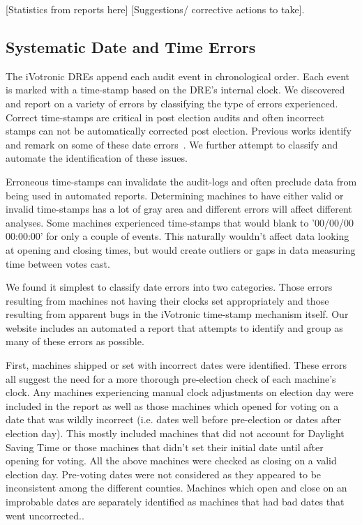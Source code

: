 [Statistics from reports here] [Suggestions/ corrective actions to take].  

\subsection{Systematic Date and Time Errors}
The iVotronic DREs append each audit event in chronological order.  Each event is marked with a time-stamp based on the DRE's internal clock.  We discovered and report on a variety of errors by classifying the type of errors experienced. Correct time-stamps are critical in post election audits and often incorrect stamps can not be automatically corrected post election.  Previous works identify and remark on some of these date errors~\cite{Buell2011,Sandler2007}.  We further attempt to classify and automate the identification of these issues.

Erroneous time-stamps can invalidate the audit-logs and often preclude data from being used in automated reports.  Determining machines to have either valid or invalid time-stamps has a lot of gray area and different errors will affect different analyses.  Some machines experienced time-stamps that would blank to '00/00/00 00:00:00' for only a couple of events.  This naturally wouldn't affect data looking at opening and closing times, but would create outliers or gaps in data measuring time between votes cast.  

We found it simplest to classify date errors into two categories.  Those errors resulting from machines not having their clocks set appropriately and those resulting from apparent bugs in the iVotronic time-stamp mechanism itself.  Our website includes an automated a report that attempts to identify and group as many of these errors as possible.

First, machines shipped or set with incorrect dates were identified.  These errors all suggest the need for a more thorough pre-election check of each machine's clock.   Any machines experiencing manual clock adjustments on election day were included in the report as well as those machines which opened for voting on a date that was wildly incorrect (i.e. dates well before pre-election or dates after election day). This mostly included machines that did not account for Daylight Saving Time or  those machines that didn't set their initial date until after opening for voting.  All the above machines were checked as closing on a valid election day.  Pre-voting dates were not considered as they appeared to be inconsistent among the different counties. Machines which open and close on an improbable dates are separately identified as machines that had bad dates that went uncorrected..  

